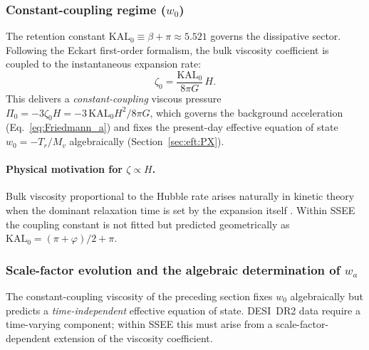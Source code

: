 \subsubsection{Constant-coupling regime ($w_0$)}

The retention constant $\mathrm{KAL}_{0} \equiv \beta + \pi \approx 5.521$
governs the dissipative sector.  Following the Eckart first-order formalism,
the bulk viscosity coefficient is coupled to the instantaneous expansion rate:
%
\begin{equation}
  \zeta_0 = \frac{\mathrm{KAL}_{0}}{8\pi G}\,H.
  \label{eq:zeta}
\end{equation}
%
This delivers a \emph{constant-coupling} viscous pressure
$\Pi_0 = -3\zeta_0 H = -3\,\mathrm{KAL}_{0}H^{2}/8\pi G$,
which governs the background acceleration (Eq.~\ref{eq:Friedmann_a}) and fixes
the present-day effective equation of state $w_0 = -T_r/M_v$ algebraically
(Section~\ref{sec:eft:PX}).

\paragraph{Physical motivation for $\zeta \propto H$.}
Bulk viscosity proportional to the Hubble rate arises naturally in
kinetic theory when the dominant relaxation time is set by the expansion
itself \citep{Weinberg1971, Brevik2005}.  Within SSEE the coupling constant
is not fitted but predicted geometrically as
$\mathrm{KAL}_{0} = (\pi+\varphi)/2 + \pi$.

\subsubsection{Scale-factor evolution and the algebraic determination of \texorpdfstring{$w_a$}{wa}}
\label{sec:eft:wa_derivation}

The constant-coupling viscosity of the preceding section fixes $w_0$
algebraically but predicts a \emph{time-independent} effective equation of
state.  DESI~DR2 data require a time-varying component; within SSEE this must
arise from a scale-factor-dependent extension of the viscosity coefficient.

